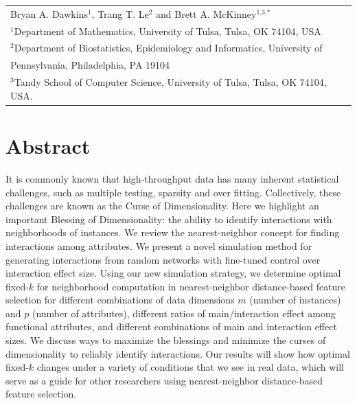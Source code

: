 \documentclass[10pt,letterpaper]{article}\usepackage[]{graphicx}\usepackage[]{color}
\begin{document}
\vspace*{0.2in}

{\Large
\textbf{} %
}
\begin{center}
  \begin{tabular}{l}
  Bryan A. Dawkins$^{\text{1}}$, Trang T. Le$^{\text{2}}$ and Brett A. McKinney$^{\text{1,3,}*}$ \\
  $^{\text{1}}$Department of Mathematics, University of Tulsa, Tulsa, OK 74104, USA \\
  $^{\text{2}}$Department of Biostatistics, Epidemiology and Informatics, University of \\
  \hphantom{2}Pennsylvania, Philadelphia, PA 19104 \\
  $^{\text{3}}$Tandy School of Computer Science, University of Tulsa, Tulsa, OK 74104, USA.
  \end{tabular}
\end{center}


\section*{Abstract}
It is commonly known that high-throughput data has many inherent statistical challenges, such as multiple testing, sparsity and over fitting. Collectively, these challenges are known as the Curse of Dimensionality. Here we highlight an important Blessing of Dimensionality: the ability to identify interactions with neighborhoods of instances. We review the nearest-neighbor concept for finding interactions among attributes. We present a novel simulation method for generating interactions from random networks with fine-tuned control over interaction effect size. Using our new simulation strategy, we determine optimal fixed-$k$ for neighborhood computation in nearest-neighbor distance-based feature selection for different combinations of data dimensions $m$ (number of instances) and $p$ (number of attributes), different ratios of main/interaction effect among functional attributes, and different combinations of main and interaction effect sizes. We discuss ways to maximize the blessings and minimize the curses of dimensionality to reliably identify interactions. Our results will show how optimal fixed-$k$ changes under a variety of conditions that we see in real data, which will serve as a guide for other researchers using nearest-neighbor distance-based feature selection. 
\end{document}
